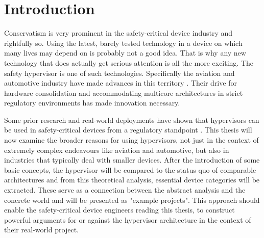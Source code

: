 
\chapter{Introduction} %

\label{Chapter1} %


\newcommand{\keyword}[1]{\textbf{#1}}
\newcommand{\bold}[1]{\textbf{#1}}
\newcommand{\tabhead}[1]{\textbf{#1}}
\newcommand{\code}[1]{\texttt{#1}}
\newcommand{\file}[1]{\texttt{\bfseries#1}}
\newcommand{\option}[1]{\texttt{\itshape#1}}

\newcommand{\mfg}{manufacturer}

Conservatism is very prominent in the safety-critical device industry and rightfully so. Using the latest, barely tested technology in a device on which many lives may depend on is probably not a good idea. That is why any new technology that does actually get serious attention is all the more exciting. The safety hypervisor is one of such technologies. Specifically the aviation and automotive industry have made advances in this territory \cite{reinhardt2014embedded} \cite{vanderleest2015mpsoc}. Their drive for hardware consolidation and accommodating multicore architectures in strict regulatory environments has made innovation necessary.

Some prior research and real-world deployments have shown that hypervisors can be used in safety-critical devices from a regulatory standpoint \cite{larrucea2015modular}.
This thesis will now examine the broader reasons for using hypervisors, not just in the context of extremely complex endeavours like aviation and automotive, but also in industries that typically deal with smaller devices. After the introduction of some basic concepts, the hypervisor will be compared to the status quo of comparable architectures and from this theoretical analysis, essential device categories will be extracted. These serve as a connection between the abstract analysis and the concrete world and will be presented as "example projects".
This approach should enable the safety-critical device engineers reading this thesis, to construct powerful arguments for or against the hypervisor architecture in the context of their real-world project.

